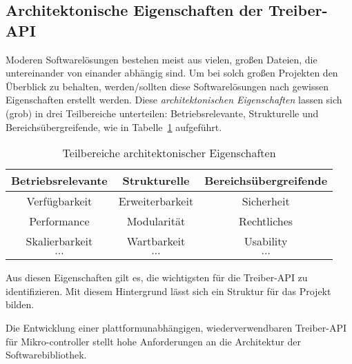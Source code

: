 


\subsection{Architektonische Eigenschaften der Treiber-API}
Moderen Softwarelösungen bestehen meist aus vielen, großen Dateien, die untereinander von einander abhängig sind.
Um bei solch großen Projekten den Überblick zu behalten, werden/sollten diese Softwarelösungen nach gewissen Eigenschaften erstellt werden.
Diese \emph{architektonischen Eigenschaften} lassen sich (grob) in drei Teilbereiche unterteilen: Betriebsrelevante, Strukturelle und Bereichsübergreifende, wie in Tabelle~\ref{tab:architektonische_eigenschaften} aufgeführt. %

\begin{table}[H]
	\begin{center}
		\begin{tabular}{ c | c | c }
			\textbf{Betriebsrelevante} & \textbf{Strukturelle} & \textbf{Bereichsübergreifende}\\
			\hline
			Verfügbarkeit & Erweiterbarkeit & Sicherheit\\
			Performance & Modularität & Rechtliches\\
			Skalierbarkeit & Wartbarkeit & Usability\\
			$\cdots$ & $\cdots$ & $\cdots$\\
		\end{tabular}
		\caption{Teilbereiche architektonischer Eigenschaften}
	    \label{tab:architektonische_eigenschaften}
	\end{center}
\end{table}

Aus diesen Eigenschaften gilt es, die wichtigsten für die Treiber-API zu identifizieren. 
Mit diesem Hintergrund lässt sich ein Struktur für das Projekt bilden.

Die Entwicklung einer plattformunabhängigen, wiederverwendbaren Treiber-API für Mikro-controller stellt hohe Anforderungen an die Architektur der Softwarebibliothek.

